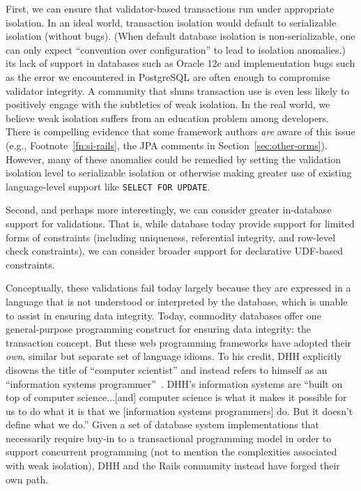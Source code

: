  First, we can ensure that
validator-based transactions run under appropriate isolation. In an
ideal world, transaction isolation would default to serializable
isolation (without bugs). (When default database isolation is
non-serializable, one can only expect ``convention over
configuration'' to lead to isolation anomalies.)  its lack of support
in databases such as Oracle 12c and implementation bugs such as the
error we encountered in PostgreSQL are often enough to compromise
validator integrity. A community that shuns transaction use is even
less likely to positively engage with the subtleties of weak
isolation.  In the real world, we believe weak isolation suffers from
an education problem among developers. There is compelling evidence
that some framework authors \textit{are} aware of this issue (e.g.,
Footnote~\ref{fn:si-rails}, the JPA comments in
Section~\ref{sec:other-orms}). However, many of these anomalies could
be remedied by setting the validation isolation level to serializable
isolation or otherwise making greater use of existing language-level
support like \texttt{SELECT FOR UPDATE}.

 Second, and perhaps more
interestingly, we can consider greater in-database support for
validations. That is, while database today provide support for limited
forms of constraints (including uniqueness, referential integrity, and
row-level check constraints), we can consider broader support for
declarative UDF-based constraints.

Conceptually, these validations fail today largely because they are
expressed in a language that is not understood or interpreted by the
database, which is unable to assist in ensuring data integrity. Today,
commodity databases offer one general-purpose programming construct
for ensuring data integrity: the transaction concept. But these web
programming frameworks have adopted their \textit{own}, similar but
separate set of language idioms. To his credit, DHH explicitly disowns
the title of ``computer scientist'' and instead refers to himself as
an ``information systems programmer''~\cite{dhh-keynote}. DHH's
information systems are ``built on top of computer science...[and]
computer science is what it makes it possible for us to do what it is
that we [information systems programmers] do. But it doesn't define
what we do.'' Given a set of database system implementations that
necessarily require buy-in to a transactional programming model in
order to support concurrent programming (not to mention the
complexities associated with weak isolation), DHH and the Rails
community instead have forged their own path.

